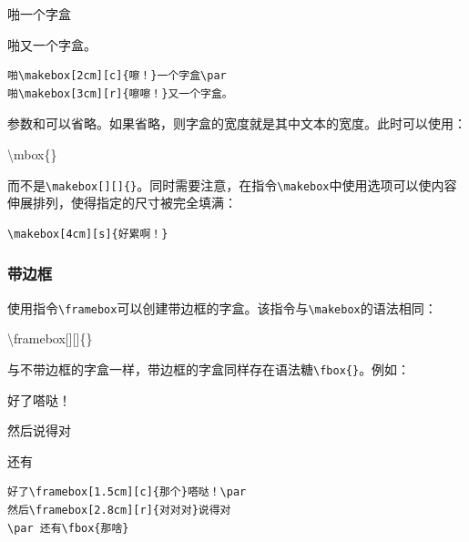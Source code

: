 \begin{codelist}[4.8]{
  啪一个字盒\par
啪又一个字盒。
}\begin{verbatim}
啪\makebox[2cm][c]{嚓！}一个字盒\par
啪\makebox[3cm][r]{嚓嚓！}又一个字盒。
\end{verbatim}
\end{codelist}

参数和可以省略。如果省略，则字盒的宽度就是其中文本的宽度。此时可以使用：

\begin{dmd}
\backslash mbox\{\}
\end{dmd}

而不是\verb|\makebox[][]{|\verb|}|。同时需要注意，在指令\verb|\makebox|中使用选项可以使内容伸展排列，使得指定的尺寸被完全填满：

\begin{codelist}[4.9]{
}\begin{verbatim}
\makebox[4cm][s]{好累啊！}
\end{verbatim}
\end{codelist}

\subsubsection{带边框}

使用指令\verb|\framebox|可以创建带边框的字盒。该指令与\verb|\makebox|的语法相同：

\begin{dmd}
  \backslash framebox[][]\{\}
\end{dmd}

与不带边框的字盒一样，带边框的字盒同样存在语法糖\verb|\fbox{|\verb|}|。例如：

\begin{codelist}[4.10]{
  好了嗒哒！\par
  然后说得对
  \par 还有
}\begin{verbatim}
好了\framebox[1.5cm][c]{那个}嗒哒！\par
然后\framebox[2.8cm][r]{对对对}说得对
\par 还有\fbox{那啥}
\end{verbatim}
\end{codelist}

